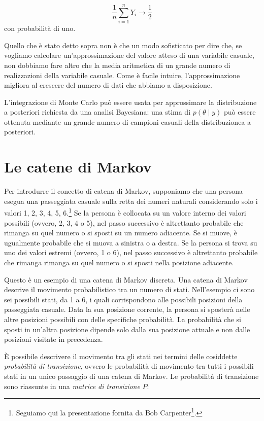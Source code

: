 \documentclass[
  11pt,
]{krantz}
\renewcommand{\href}[2]{#2\footnote{\url{#1}}}
\theoremstyle{definition}
\theoremstyle{definition}
\theoremstyle{definition}
\theoremstyle{definition}
\theoremstyle{remark}
\begin{document}
\[
  \frac{1}{n} \sum_{i=1}^n Y_i \rightarrow \frac{1}{2}
\] con probabilità di uno.

Quello che è stato detto sopra non è che un modo sofisticato per dire che, se vogliamo calcolare un'approssimazione del valore atteso di una variabile casuale, non dobbiamo fare altro che la media aritmetica di un grande numero di realizzazioni della variabile casuale. Come è facile intuire, l'approssimazione migliora al crescere del numero di dati che abbiamo a disposizione.

L'integrazione di Monte Carlo può essere usata per approssimare la distribuzione a posteriori richiesta da una analisi Bayesiana: una stima di \(p(\theta \mid y)\) può essere ottenuta mediante un grande numero di campioni casuali della distribuzionea a posteriori.

\hypertarget{markov-chains}{%
\chapter{Le catene di Markov}\label{markov-chains}}

Per introdurre il concetto di catena di Markov, supponiamo che una persona esegua una passeggiata casuale sulla retta dei numeri naturali considerando solo i valori 1, 2, 3, 4, 5, 6.\footnote{Seguiamo qui la presentazione fornita da \href{https://github.com/bob-carpenter/prob-stats}{Bob Carpenter}.} Se la persona è collocata su un valore interno dei valori possibili (ovvero, 2, 3, 4 o 5), nel passo successivo è altrettanto probabile che rimanga su quel numero o si sposti su un numero adiacente. Se si muove, è ugualmente probabile che si muova a sinistra o a destra. Se la persona si trova su uno dei valori estremi (ovvero, 1 o 6), nel passo successivo è altrettanto probabile che rimanga rimanga su quel numero o si sposti nella posizione adiacente.

Questo è un esempio di una catena di Markov discreta. Una catena di Markov descrive il movimento probabilistico tra un numero di stati. Nell'esempio ci sono sei possibili stati, da 1 a 6, i quali corrispondono alle possibili posizioni della passeggiata casuale. Data la sua posizione corrente, la persona si sposterà nelle altre posizioni possibili con delle specifiche probabilità. La probabilità che si sposti in un'altra posizione dipende solo dalla sua posizione attuale e non dalle posizioni visitate in precedenza.

È possibile descrivere il movimento tra gli stati nei termini delle cosiddette \emph{probabilità di transizione}, ovvero le probabilità di movimento tra tutti i possibili stati in un unico passaggio di una catena di Markov. Le probabilità di transizione sono riassunte in una \emph{matrice di transizione} \(P\):
\end{document}
